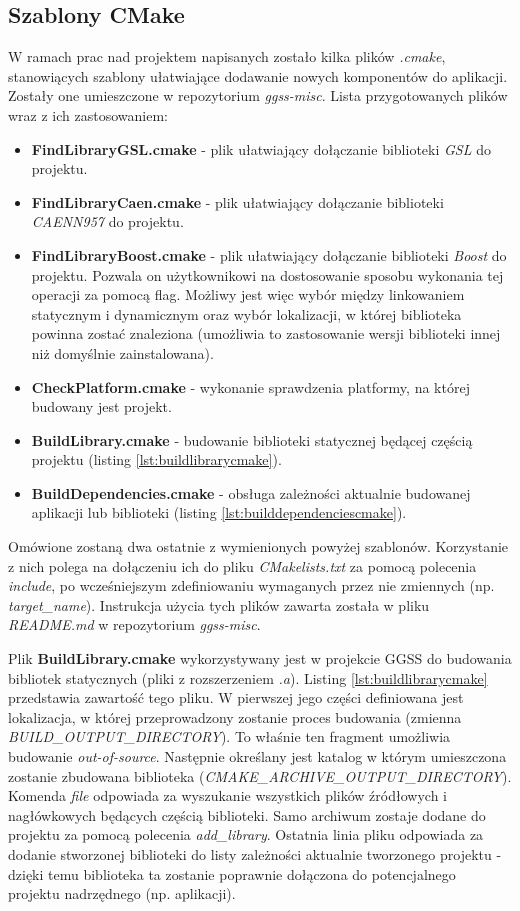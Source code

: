 \subsection{Szablony CMake}
W ramach prac nad projektem napisanych zostało kilka plików \textit{.cmake}, stanowiących szablony ułatwiające dodawanie nowych komponentów do aplikacji. Zostały one umieszczone w repozytorium \textit{ggss-misc}. Lista przygotowanych plików wraz z ich zastosowaniem:
\begin{itemize}
\item \textbf{FindLibraryGSL.cmake} - plik ułatwiający dołączanie biblioteki \textit{GSL} do projektu.
\item \textbf{FindLibraryCaen.cmake} - plik ułatwiający dołączanie biblioteki \textit{CAENN957} do projektu.
\item \textbf{FindLibraryBoost.cmake} -  plik ułatwiający dołączanie biblioteki \textit{Boost} do projektu. Pozwala on użytkownikowi na dostosowanie sposobu wykonania tej operacji za pomocą flag. Możliwy jest więc wybór między linkowaniem statycznym i dynamicznym oraz wybór lokalizacji, w której biblioteka powinna zostać znaleziona (umożliwia to zastosowanie wersji biblioteki innej niż domyślnie zainstalowana). 
\item \textbf{CheckPlatform.cmake} - wykonanie sprawdzenia platformy, na której budowany jest projekt.
\item \textbf{BuildLibrary.cmake} - budowanie biblioteki statycznej będącej częścią projektu (listing \ref{lst:buildlibrarycmake}).
\item \textbf{BuildDependencies.cmake} - obsługa zależności aktualnie budowanej aplikacji lub biblioteki (listing \ref{lst:builddependenciescmake}). 
\end{itemize}

Omówione zostaną dwa ostatnie z wymienionych powyżej szablonów. Korzystanie z nich polega na dołączeniu ich do pliku \textit{CMakelists.txt} za pomocą polecenia \textit{include}, po wcześniejszym zdefiniowaniu wymaganych przez nie zmiennych (np. \textit{target\_name}). Instrukcja użycia tych plików zawarta została w pliku \textit{README.md} w repozytorium \textit{ggss-misc}.

Plik \textbf{BuildLibrary.cmake} wykorzystywany jest w projekcie GGSS do budowania bibliotek statycznych (pliki z rozszerzeniem \textit{.a}). Listing \ref{lst:buildlibrarycmake} przedstawia zawartość tego pliku. W pierwszej jego części definiowana jest lokalizacja, w której przeprowadzony zostanie proces budowania (zmienna \textit{BUILD\_OUTPUT\_DIRECTORY}). To właśnie ten fragment umożliwia budowanie \textit{out-of-source}. Następnie określany jest katalog w którym umieszczona zostanie zbudowana biblioteka (\textit{CMAKE\_ARCHIVE\_OUTPUT\_DIRECTORY}). Komenda \textit{file} odpowiada za wyszukanie wszystkich plików źródłowych i nagłówkowych będących częścią biblioteki. Samo archiwum zostaje dodane do projektu za pomocą polecenia \textit{add\_library}. Ostatnia linia pliku odpowiada za dodanie stworzonej biblioteki do listy zależności aktualnie tworzonego projektu - dzięki temu biblioteka ta zostanie poprawnie dołączona do potencjalnego projektu nadrzędnego (np. aplikacji).


